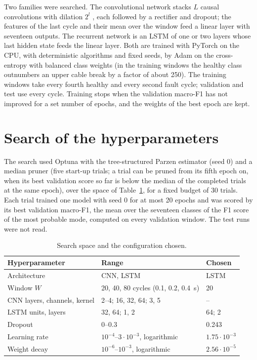 \documentclass[10pt]{article}
\begin{document}
Two families were searched. The convolutional network stacks $L$ causal convolutions with dilation $2^{l}$ \citep{bai2018tcn}, each followed by a rectifier and dropout; the features of the last cycle and their mean over the window feed a linear layer with seventeen outputs. The recurrent network is an LSTM \citep{hochreiter1997lstm} of one or two layers whose last hidden state feeds the linear layer. Both are trained with PyTorch \citep{paszke2019pytorch} on the CPU, with deterministic algorithms and fixed seeds, by Adam \citep{kingma2015adam} on the cross-entropy with balanced class weights (in the training windows the healthy class outnumbers an upper cable break by a factor of about 250). The training windows take every fourth healthy and every second fault cycle; validation and test use every cycle. Training stops when the validation macro-F1 has not improved for a set number of epochs, and the weights of the best epoch are kept.

\section{Search of the hyperparameters}\label{sec:search}

The search used Optuna \citep{akiba2019optuna} with the tree-structured Parzen estimator \citep{bergstra2011tpe} (seed 0) and a median pruner (five start-up trials; a trial can be pruned from its fifth epoch on, when its best validation score so far is below the median of the completed trials at the same epoch), over the space of Table~\ref{tab:space}, for a fixed budget of 30 trials. Each trial trained one model with seed 0 for at most 20 epochs and was scored by its best validation macro-F1, the mean over the seventeen classes of the F1 score of the most probable mode, computed on every validation window. The test runs were not read.

\begin{table}[h]
\centering\small
\caption{Search space and the configuration chosen.}\label{tab:space}
\begin{tabular}{@{}lll@{}}
\toprule
Hyperparameter & Range & Chosen \\
\midrule
Architecture & CNN, LSTM & LSTM \\
Window $W$ & 20, 40, 80 cycles (0.1, 0.2, 0.4~s) & 20 \\
CNN layers, channels, kernel & 2--4; 16, 32, 64; 3, 5 & -- \\
LSTM units, layers & 32, 64; 1, 2 & 64; 2 \\
Dropout & 0--0.3 & 0.243 \\
Learning rate & $10^{-4}$--$3\cdot10^{-3}$, logarithmic & $1.75\cdot10^{-3}$ \\
Weight decay & $10^{-6}$--$10^{-3}$, logarithmic & $2.56\cdot10^{-5}$ \\
\bottomrule
\end{tabular}
\end{table}
\end{document}
